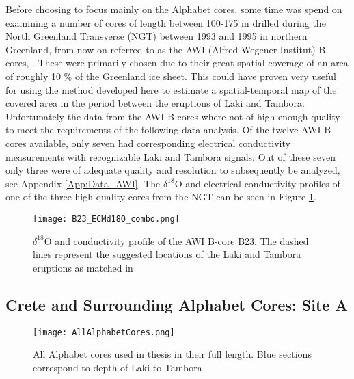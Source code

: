 \documentclass[../../CompleteThesis2/Complete_2ndDraft]{subfiles}
\begin{document}
Before choosing to focus mainly on the Alphabet cores, some time was spend on examining a number of cores of length between 100-175 m drilled during the North Greenland Transverse (NGT) between 1993 and 1995 in northern Greenland, from now on referred to as the AWI (Alfred-Wegener-Institut) B-cores, \cite[Weissbach et al. 2016]{Weissbach2016}. These were primarily chosen due to their great spatial coverage of an area of roughly 10 \% of the Greenland ice sheet. This could have proven very useful for using the method developed here to estimate a spatial-temporal map of the covered area in the period between the eruptions of Laki and Tambora. Unfortunately the data from the AWI B-cores where not of high enough quality to meet the requirements of the following data analysis. Of the twelve AWI B cores available, only seven had corresponding electrical conductivity measurements with recognizable Laki and Tambora signals. Out of these seven only three were of adequate quality and resolution to subsequently be analyzed, see Appendix \ref{App:Data_AWI}. The $\delta^{18}$O and electrical conductivity profiles of one of the three high-quality cores from the NGT can be seen in Figure \ref{fig:B23_ECMd18O_combo}.

\begin{figure}[h]
	\centering
	\texttt{[image: B23\_ECMd18O\_combo.png]}
	\caption[ECM and $\delta^{18}$O data between Laki and Tambora, Site B23.]{\small $\delta^{18}$O and conductivity profile of the AWI B-core B23. The dashed lines represent the suggested locations of the Laki and Tambora eruptions as matched in \cite[Weissbach et al. 2016]{Weissbach2016}}
	\label{fig:B23_ECMd18O_combo}
\end{figure}


\subsection[Crete Area][Crete Area]{Crete and Surrounding Alphabet Cores: Site A}
\label{Subsec:Data_Selection_Alhabet}

\begin{figure}[h]
	\centering
	\texttt{[image: AllAlphabetCores.png]}
	\caption[All Alphabet core $\delta^{18}$O profiles in full.]{\small All Alphabet cores used in thesis in their full length. Blue sections correspond to depth of Laki to Tambora}
	\label{fig:AllAlphabetCores}
\end{figure}
\end{document}
